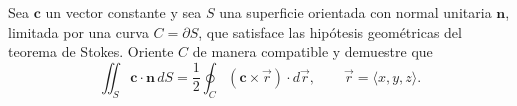 ﻿Sea $\mathbf c$ un vector constante y sea $S$ una superficie orientada con normal unitaria $\mathbf n$, limitada por una curva $C=\partial S$, que satisface las hipótesis geométricas del teorema de Stokes. Oriente $C$ de manera compatible y demuestre que
\[
\iint_S\mathbf c\cdot\mathbf n\,dS
=\frac12\oint_C(\mathbf c\times\vec r)\cdot d\vec r,
\qquad \vec r=\langle x,y,z\rangle.
\]
